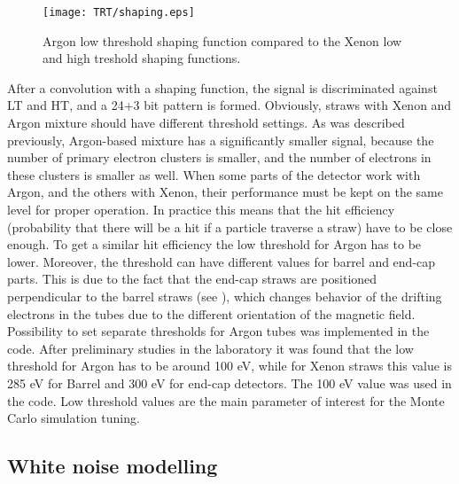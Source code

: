 \begin{figure}
\begin{center}
 \texttt{[image: TRT/shaping.eps]}
\caption{Argon low threshold shaping function compared to the Xenon low and high treshold shaping functions.}
\label{fig:shaping}
\end{center}
\end{figure}


After a convolution with a shaping function, the signal is discriminated against LT and HT, and a 24+3 bit pattern is formed.
Obviously, straws with Xenon and Argon mixture should have different threshold settings.
As was described previously, Argon-based mixture has a significantly smaller signal, because
the number of primary electron clusters is smaller, and the number of electrons in these clusters is smaller as well.
When some parts of the detector work with Argon, and the others with Xenon, their performance must be kept on the same level for
proper operation. In practice this means that the hit efficiency (probability that there will be a hit if a particle traverse a straw) have to be close enough. 
To get a similar hit efficiency the low threshold for Argon has to be lower.
Moreover, the threshold can have different values for barrel and end-cap parts. This is due to the fact that the end-cap straws are positioned perpendicular to the barrel straws (see ), %
which changes behavior of the drifting electrons in the tubes due to the different orientation of the magnetic field.
Possibility to set separate thresholds for Argon tubes was implemented in the code.
After preliminary studies in the laboratory it was found that the low threshold for Argon has to be around 100 eV, 
while for Xenon straws this value is 285 eV for Barrel and 300 eV for end-cap detectors. The 100 eV value was used in the code.
Low threshold values are the main parameter of interest for the Monte Carlo simulation tuning.

\subsection{White noise modelling}

